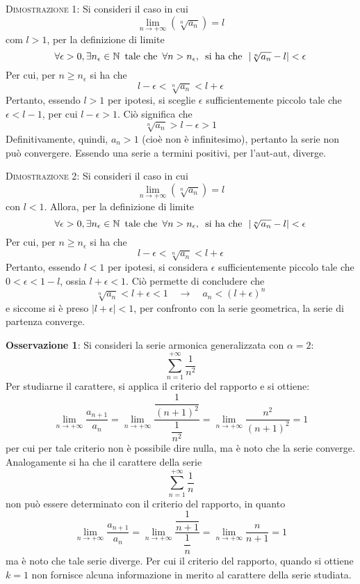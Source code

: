\documentclass[a4paper]{extarticle}
\begin{document}
\vspace{2em}
\noindent
\normalfont \normalsize
\textsc{Dimostrazione 1}: Si consideri il caso in cui 
\[\lim_{n \to +\infty} \left(\sqrt[n]{a_n}\right)=l\]
com $l>1$, per la definizione di limite
\[\forall \epsilon > 0, \exists n_\epsilon \in \mathbb{N} \hspace{0.5em} \text{tale che} \hspace{0.5em} \forall n > n_\epsilon, \hspace{0.5em} \text{si ha che} \hspace{0.5em} \left \vert \sqrt[n]{a_n} - l \right \vert < \epsilon\]
Per cui, per $n \geq n_\epsilon$ si ha che
\[l-\epsilon<\sqrt[n]{a_n}<l+\epsilon\]
Pertanto, essendo $l>1$ per ipotesi, si sceglie $\epsilon$ sufficientemente piccolo tale che $\epsilon<l-1$, per cui $l-\epsilon>1$. Ciò significa che 
\[\sqrt[n]{a_n}>l-\epsilon>1\]
Definitivamente, quindi, $a_n>1$ (cioè non è infinitesimo), pertanto la serie non può convergere. Essendo una serie a termini positivi, per l'aut-aut, diverge.

\vspace{2em}
\noindent
\normalfont \normalsize
\textsc{Dimostrazione 2}: Si consideri il caso in cui 
\[\lim_{n \to +\infty} \left(\sqrt[n]{a_n}\right)=l\]
con $l<1$. Allora, per la definizione di limite
\[\forall \epsilon > 0, \exists n_\epsilon \in \mathbb{N} \hspace{0.5em} \text{tale che} \hspace{0.5em} \forall n > n_\epsilon, \hspace{0.5em} \text{si ha che} \hspace{0.5em} \left \vert \sqrt[n]{a_n} - l \right \vert < \epsilon\]
Per cui, per $n \geq n_\epsilon$ si ha che
\[l-\epsilon<\sqrt[n]{a_n}<l+\epsilon\]
Pertanto, essendo $l<1$ per ipotesi, si considera $\epsilon$ sufficientemente piccolo tale che $0 < \epsilon < 1-l$, ossia $l+\epsilon<1$. Ciò permette di concludere che
\[\sqrt[n]{a_n} < l+\epsilon < 1 \hspace{1em} \rightarrow \hspace{1em} a_n < (l+\epsilon)^n\]
e siccome si è preso $\vert l+\epsilon \vert < 1$, per confronto con la serie geometrica, la serie di partenza converge.

\vspace{2em}
\noindent
\textbf{Osservazione 1}: Si consideri la serie armonica generalizzata con $\alpha=2$:
\[\sum_{n=1}^{+\infty} \frac{1}{n^2}\]
Per studiarne il carattere, si applica il criterio del rapporto e si ottiene:
\[\lim_{n \to +\infty} \frac{a_{n+1}}{a_n} = \lim_{n \to +\infty} \dfrac{\dfrac{1}{(n+1)^2}}{\dfrac{1}{n^2}} = \lim_{n \to +\infty} \frac{n^2}{(n+1)^2} = 1\]
per cui per tale criterio non è possibile dire nulla, ma è noto che la serie converge.\\
Analogamente si ha che il carattere della serie
\[\sum_{n=1}^{+\infty} \frac{1}{n}\]
non può essere determinato con il criterio del rapporto, in quanto
\[\lim_{n \to +\infty} \frac{a_{n+1}}{a_n} = \lim_{n \to +\infty} \dfrac{\dfrac{1}{n+1}}{\dfrac{1}{n}} = \lim_{n \to +\infty} \frac{n}{n+1} = 1\]
ma è noto che tale serie diverge. Per cui il criterio del rapporto, quando si ottiene $k=1$ non fornisce alcuna informazione in merito al carattere della serie studiata.
\end{document}
